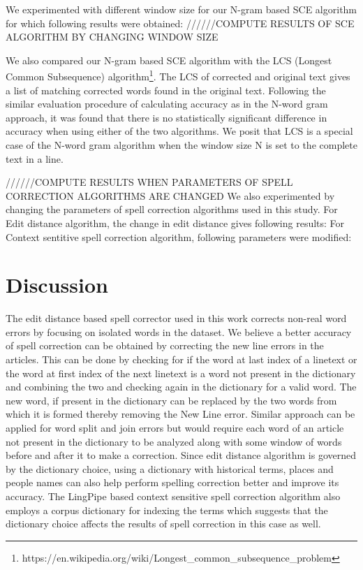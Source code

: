 \documentclass[preprint,11pt]{elsarticle}
\begin{document}
We experimented with different window size for our N-gram based SCE algorithm for which following results were obtained:
//////COMPUTE RESULTS OF SCE ALGORITHM BY CHANGING WINDOW SIZE

We  also compared our N-gram based SCE algorithm with the LCS (Longest Common Subsequence) algorithm\footnote{https://en.wikipedia.org/wiki/Longest\_common\_subsequence\_problem}. The LCS of corrected and original text gives a list of matching corrected words found in the original text. Following the similar evaluation procedure of calculating accuracy as in the N-word gram approach, %
it was found that there is no statistically significant difference in accuracy when using either of the two algorithms. We posit that LCS is a special case of the N-word gram algorithm when the window size N is set to the complete text in a line.

//////COMPUTE RESULTS WHEN PARAMETERS OF SPELL CORRECTION ALGORITHMS ARE CHANGED
We also experimented by changing the parameters of spell correction algorithms used in this study. For Edit distance algorithm, the change in edit distance gives following results:
For Context sentitive spell correction algorithm, following parameters were modified:


\section{Discussion}
\label{spell:discuss}
The edit distance based spell corrector used in this work corrects non-real word errors by focusing on isolated words in the dataset.
We believe a better accuracy of spell correction can be obtained by correcting the new line errors in the articles. This can be done by checking for if the word at last index of a linetext or the word at first index of the next linetext is a word not present in the dictionary and combining the two and checking again in the dictionary for a valid word. The new word, if present in the dictionary can be replaced by the two words from which it is formed thereby removing the New Line error. Similar approach can be applied for word split and join errors but would require each word of an article not present in the dictionary to be analyzed along with some window of words before and after it to make a correction. 
Since edit distance algorithm is governed by the dictionary choice, using a dictionary with historical terms, places and people names can also help perform spelling correction better and improve its accuracy.
The LingPipe based context sensitive spell correction algorithm also employs a corpus dictionary for indexing the terms which suggests that the dictionary choice affects the results of spell correction in this case as well.
\end{document}
